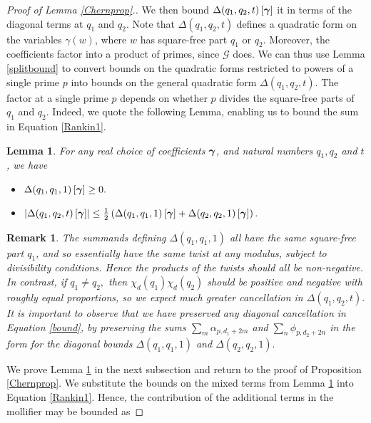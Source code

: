\documentclass[12pt]{amsart}
\numberwithin{equation}{section}
\newtheorem{lem}[thm]{Lemma}
\newtheorem*{rem}{Remark}
\numberwithin{thm}{section}
\newcommand{\1}{\mathbf 1}
\begin{document}
\begin{proof}[Proof of Lemma \ref{Chernprop}.]
		
	We then bound $\Delta(q_1,q_2,t)\left[\mbox{\boldmath$\gamma$}\right]$  it in terms of the diagonal terms at $q_1$ and $q_2$.
	Note that $\Delta(q_1,q_2,t)$ defines a quadratic form on the variables $\gamma(w)$, where $w$ has square-free part $q_1$ or $q_2$. Moreover, the coefficients factor into a product of primes, since $\mathcal{G}$ does.
	We can thus use Lemma \ref{splitbound} to convert bounds on the quadratic forms restricted to powers of a single prime $p$ into bounds on the general quadratic form $\Delta(q_1,q_2,t)$. The factor at a single prime $p$ depends on whether $p$ divides the square-free parts of $q_1$ and $q_2$.
	Indeed, we quote the following Lemma, enabling us to bound the sum in Equation \eqref{Rankin1}.
			\begin{lem} \label{switchcher} For any real choice of coefficients $\mbox{\boldmath$\gamma$}$, and natural numbers $q_1,q_2$ and $t$, we have
		\begin{itemize}
			\item\label{posdeftarget} $\Delta(q_1,q_1,1)\left[\mbox{\boldmath$\gamma$}\right]\ge 0.$\\
			\item \label{bound}$\left|\Delta(q_1,q_2,t)\left[\mbox{\boldmath$\gamma$}\right]\right|\le \frac{1}{2} \left(\Delta(q_1,q_1,1)\left[\mbox{\boldmath$\gamma$}\right]+\Delta(q_2,q_2,1)\left[\mbox{\boldmath$\gamma$}\right]\right). $
		\end{itemize}
		\end{lem}
		\begin{rem}
			The summands defining $\Delta(q_1,q_1,1)$ all have the same square-free part $q_1$, and so essentially have the same twist at any modulus, subject to divisibility conditions. Hence the products of the twists should all be non-negative. In contrast, if $q_1\ne q_2,$ then $\chi_d(q_1)\chi_d(q_2)$ should be positive and negative with roughly equal proportions, so we expect much greater cancellation in $\Delta(q_1,q_2,t).$		It is important to observe that we have preserved any diagonal cancellation in Equation \eqref{bound}, by preserving the sums $\sum_m  \alpha_{p,d_1+2m}$ and $\sum_n \phi_{p,d_2+2n}$ in the form for the diagonal bounds $\Delta(q_1,q_1,1)$ and $\Delta(q_2,q_2,1).$
		\end{rem}
		We prove Lemma \ref{switchcher} in the next subsection and return to the proof of Proposition \ref{Chernprop}.
			We substitute the bounds on the mixed terms from Lemma \ref{switchcher} into Equation \eqref{Rankin1}.
		Hence, the contribution of the additional terms in the mollifier may be bounded as

\end{proof}
\end{document}
